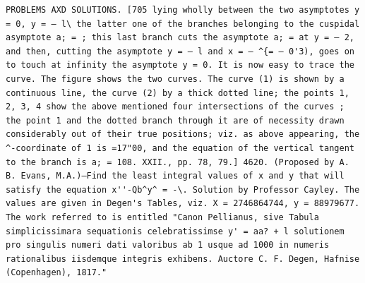 \documentclass[12pt]{article}
\theoremstyle{plain}
\begin{document}
\newpage
\setcounter{page}{586}
\begin{verbatim}
PROBLEMS AXD SOLUTIONS. [705 lying wholly between the two asymptotes y = 0, y = — l\ the latter one of the branches belonging to the cuspidal asymptote a; = ; this last branch cuts the asymptote a; = at y = — 2, and then, cutting the asymptote y = — l and x = — ^{= — 0'3), goes on to touch at infinity the asymptote y = 0. It is now easy to trace the curve. The figure shows the two curves. The curve (1) is shown by a continuous line, the curve (2) by a thick dotted line; the points 1, 2, 3, 4 show the above mentioned four intersections of the curves ; the point 1 and the dotted branch through it are of necessity drawn considerably out of their true positions; viz. as above appearing, the ^-coordinate of 1 is =17"00, and the equation of the vertical tangent to the branch is a; = 108. XXII., pp. 78, 79.] 4620. (Proposed by A. B. Evans, M.A.)—Find the least integral values of x and y that will satisfy the equation x''-Qb^y^ = -\. Solution by Professor Cayley. The values are given in Degen's Tables, viz. X = 2746864744, y = 88979677. The work referred to is entitled "Canon Pellianus, sive Tabula simplicissimara sequationis celebratissimse y' = aa? + l solutionem pro singulis numeri dati valoribus ab 1 usque ad 1000 in numeris rationalibus iisdemque integris exhibens. Auctore C. F. Degen, Hafnise (Copenhagen), 1817." 
\end{verbatim}
\end{document}
